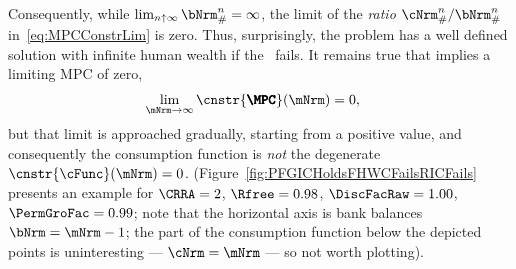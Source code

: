 \documentclass[\econtexRoot/BufferStockTheory]{subfiles}
\begin{document}
Consequently, while $\lim_{n \uparrow \infty} \bNrm_{\#}^{n} = \infty$, the limit of the \textit{ratio} $\cNrm_{\#}^{n}/\bNrm_{\#}^{n}$ in~\eqref{eq:MPCConstrLim} is zero.
Thus, surprisingly, the problem has a well defined solution with
infinite human wealth if the \RIC~fails.
It remains true that \cncl{\RIC}
implies a limiting MPC of zero,
\begin{equation}\begin{gathered}\begin{aligned}
  \lim_{\mNrm \rightarrow \infty} \cnstr{\pmb{\MPC}}(\mNrm)   & = 0,
\end{aligned}\end{gathered}\end{equation}
but that limit is approached gradually, starting from a positive value, and consequently the consumption function is \textit{not} the degenerate $\cnstr{\cFunc}(\mNrm)=0$.
(Figure~\ref{fig:PFGICHoldsFHWCFailsRICFails} presents an example for $\CRRA=2$, $\Rfree=0.98$, $\DiscFacRaw = 1.00$, $\PermGroFac = 0.99$; note that the horizontal axis is bank balances $\bNrm = \mNrm-1$; the part of the consumption function below the depicted points is uninteresting --- $\cNrm = \mNrm$ --- so not worth plotting).



\end{document}
